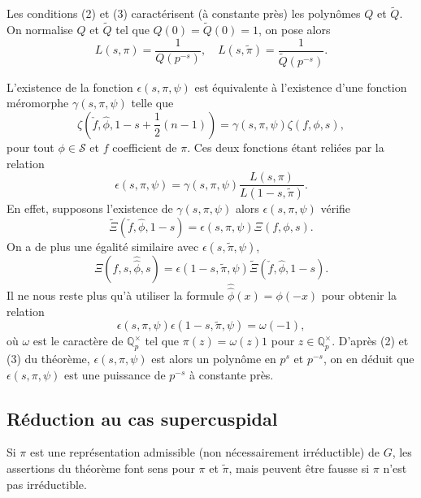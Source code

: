 Les conditions (2) et (3) caractérisent (à constante près) les polynômes $Q$ et $\tilde{Q}$. On normalise $Q$ et $\tilde{Q}$ tel que $Q(0)=\tilde{Q}(0)=1$, on pose alors
\begin{equation}
L(s, \pi) = \frac{1}{Q(p^{-s})}, \quad L(s, \tilde{\pi}) = \frac{1}{\tilde{Q}(p^{-s})}.
\end{equation}

L'existence de la fonction $\epsilon(s, \pi, \psi)$ est équivalente à l'existence d'une fonction méromorphe $\gamma(s,\pi,\psi)$ telle que
\begin{equation}
\zeta(\check{f}, \hat{\phi}, 1-s+\frac{1}{2}(n-1))=\gamma(s, \pi, \psi)\zeta(f, \phi, s),
\end{equation}
pour tout $\phi \in \mathcal{S}$ et $f$ coefficient de $\pi$. Ces deux fonctions étant reliées par la relation
\begin{equation}
\label{gammaepsilon}
\epsilon(s,\pi,\psi)=\gamma(s,\pi,\psi)\frac{L(s,\pi)}{L(1-s,\tilde{\pi})}.
\end{equation}
En effet, supposons l'existence de $\gamma(s,\pi,\psi)$ alors $\epsilon(s,\pi,\psi)$ vérifie 
\begin{equation}
\tilde{\Xi}(\check{f}, \hat{\phi}, 1-s) = \epsilon(s, \pi, \psi)\Xi(f, \phi, s).
\end{equation}
On a de plus une égalité similaire avec $\epsilon(s,\tilde{\pi},\psi)$,
\begin{equation}
\Xi(f, s, \hat{\hat{\phi}}, s)=\epsilon(1-s, \tilde{\pi}, \psi)\tilde{\Xi}(\check{f}, \hat{\phi}, 1-s).
\end{equation}
Il ne nous reste plus qu'à utiliser la formule $\hat{\hat{\phi}}(x)=\phi(-x)$ pour obtenir la relation
\begin{equation}
\epsilon(s, \pi, \psi)\epsilon(1-s, \tilde{\pi}, \psi)=\omega(-1),
\end{equation}
où $\omega$ est le caractère de $\mathbb{Q}_p^\times$ tel que $\pi(z)=\omega(z)1$ pour $z\in \mathbb{Q}_p^\times$. D'après (2) et (3) du théorème, $\epsilon(s, \pi, \psi)$ est alors un polynôme en $p^s$ et $p^{-s}$, on en déduit que $\epsilon(s, \pi, \psi)$ est une puissance de $p^{-s}$ à constante près.

\subsection{Réduction au cas supercuspidal}

Si $\pi$ est une représentation admissible (non nécessairement irréductible) de $G$, les assertions du théorème font sens pour $\pi$ et $\tilde{\pi}$, mais peuvent être fausse si $\pi$ n'est pas irréductible.

